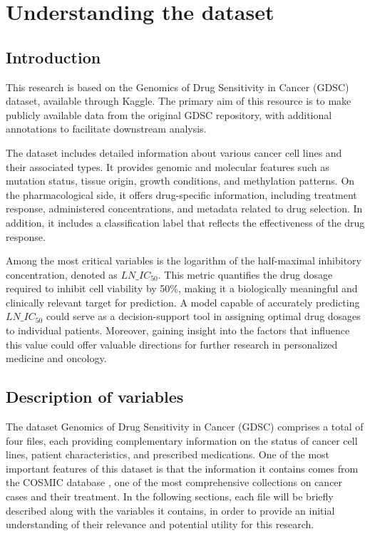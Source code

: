 \chapter{Understanding the dataset}\label{cap:analisis}


\section{Introduction}

This research is based on the Genomics of Drug Sensitivity in Cancer (GDSC) dataset, available through Kaggle. The primary aim of this resource is to make publicly available data from the original GDSC repository, with additional annotations to facilitate downstream analysis.

The dataset includes detailed information about various cancer cell lines and their associated types. It provides genomic and molecular features such as mutation status, tissue origin, growth conditions, and methylation patterns. On the pharmacological side, it offers drug-specific information, including treatment response, administered concentrations, and metadata related to drug selection. In addition, it includes a classification label that reflects the effectiveness of the drug response.

Among the most critical variables is the logarithm of the half-maximal inhibitory concentration, denoted as \(LN\_IC_{50}\). This metric quantifies the drug dosage required to inhibit cell viability by 50\%, making it a biologically meaningful and clinically relevant target for prediction. A model capable of accurately predicting \(LN\_IC_{50}\) could serve as a decision-support tool in assigning optimal drug dosages to individual patients. Moreover, gaining insight into the factors that influence this value could offer valuable directions for further research in personalized medicine and oncology.

\section{Description of variables}

The dataset Genomics of Drug Sensitivity in Cancer (GDSC) comprises a total of four files, each providing complementary information on the status of cancer cell lines, patient characteristics, and prescribed medications. One of the most important features of this dataset is that the information it
contains comes from the COSMIC database \cite{cosmic}, one of the most comprehensive
collections on cancer cases and their treatment. In the following sections, each file will be briefly described along with the variables it contains, in order to provide an initial understanding of their relevance and potential utility for this research.

